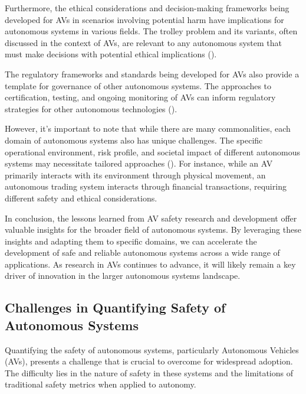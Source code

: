 Furthermore, the ethical considerations and decision-making frameworks being developed for AVs in scenarios involving potential harm have implications for autonomous systems in various fields. The trolley problem and its variants, often discussed in the context of AVs, are relevant to any autonomous system that must make decisions with potential ethical implications (\cite{Awad2018}).

The regulatory frameworks and standards being developed for AVs also provide a template for governance of other autonomous systems. The approaches to certification, testing, and ongoing monitoring of AVs can inform regulatory strategies for other autonomous technologies (\cite{Cummings2021}).

However, it's important to note that while there are many commonalities, each domain of autonomous systems also has unique challenges. The specific operational environment, risk profile, and societal impact of different autonomous systems may necessitate tailored approaches (\cite{Endsley2017}). For instance, while an AV primarily interacts with its environment through physical movement, an autonomous trading system interacts through financial transactions, requiring different safety and ethical considerations.

In conclusion, the lessons learned from AV safety research and development offer valuable insights for the broader field of autonomous systems. By leveraging these insights and adapting them to specific domains, we can accelerate the development of safe and reliable autonomous systems across a wide range of applications. As research in AVs continues to advance, it will likely remain a key driver of innovation in the larger autonomous systems landscape.


\subsection{Challenges in Quantifying Safety of Autonomous Systems}

Quantifying the safety of autonomous systems, particularly Autonomous Vehicles (AVs), presents a challenge that is crucial to overcome for widespread adoption. The difficulty lies in the nature of safety in these systems and the limitations of traditional safety metrics when applied to autonomy.

